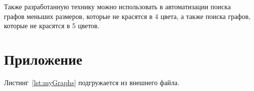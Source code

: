 Также разработанную технику можно использовать в автоматизации поиска графов меньших размеров, которые не красятся в 4 цвета, а также поиска графов, которые не красятся в 5 цветов.

\chapter{Приложение}

Листинг~\ref{lst:myGraphs} подгружается из внешнего файла. 

\begingroup
    
\endgroup
 
\begingroup
    
\endgroup

\begingroup
    
\endgroup


\begingroup
    
\endgroup


\begingroup
    
\endgroup
 
  
\label{chapt1}
